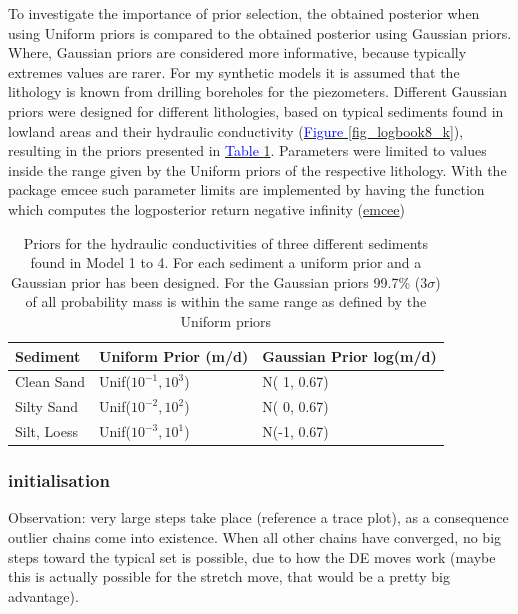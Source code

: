 To investigate the importance of prior selection, the obtained posterior when using Uniform priors is compared to the obtained posterior using Gaussian priors. Where, Gaussian priors are considered more informative, because typically extremes values are rarer. %
For my synthetic models it is assumed that the lithology is known from drilling boreholes for the piezometers. Different Gaussian priors were designed for different lithologies, based on typical sediments found in lowland areas and their hydraulic conductivity (\hyperref[fig_logbook8_k]{\textcolor{blue}{Figure }\ref{fig_logbook8_k}}), resulting in the priors presented in \hyperref[tab_logbook8_priors]{\textcolor{blue}{Table }\ref{tab_logbook8_priors}}. 
Parameters were limited to values inside the range given by the Uniform priors of the respective lithology. With the package emcee such parameter limits are implemented by having the function which computes the logposterior return negative infinity (\href{https://emcee.readthedocs.io/en/stable/user/faq/}{emcee})

\begin{table}[ht]
\centering
\caption{Priors for the hydraulic conductivities of three different sediments found in Model 1 to 4. For each sediment a uniform prior and a Gaussian prior has been designed. For the Gaussian priors 99.7\% ($3\sigma$) of all probability mass is within the same range as defined by the Uniform priors}
\label{tab_logbook8_priors}
\begin{tabularx}{\textwidth}{XXX}
\toprule
Sediment & Uniform Prior (m/d) & Gaussian Prior log(m/d)\\
\midrule
Clean Sand & Unif($10^{-1}, 10^3$) & N( 1, 0.67)  \\
Silty Sand  & Unif($10^{-2}, 10^2$) & N( 0, 0.67) \\
Silt, Loess   & Unif($10^{-3}, 10^1$)  &  N(-1, 0.67) \\
\bottomrule
\end{tabularx}
\centering
\end{table}

\subsubsection{initialisation}
Observation: very large steps take place (reference a trace plot), as a consequence outlier chains come into existence. When all other chains have converged, no big steps toward the typical set is possible, due to how the DE moves work (maybe this is actually possible for the stretch move, that would be a pretty big advantage). 

